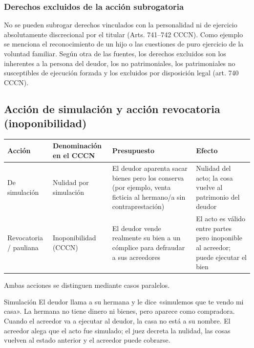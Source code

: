 \documentclass[12pt,oneside]{book}
\newenvironment{tabla}{%
    \par\medskip\begingroup\small\renewcommand{\arraystretch}{1.3}\noindent\ignorespaces
}{%
    \par\endgroup\medskip
}
\begin{document}
\subsubsection{Derechos excluidos de la acción subrogatoria}

No se pueden subrogar derechos vinculados con la personalidad ni de ejercicio absolutamente discrecional por el titular (Arts. 741--742 CCCN). Como ejemplo se menciona el reconocimiento de un hijo o las cuestiones de puro ejercicio de la voluntad familiar. Según otra de las fuentes, los derechos excluidos son los inherentes a la persona del deudor, los no patrimoniales, los patrimoniales no susceptibles de ejecución forzada y los excluidos por disposición legal (art. 740 CCCN).


\subsection{Acción de simulación y acción revocatoria (inoponibilidad)}

\begin{tabla}
\begin{tabularx}{\textwidth}{B{2.6cm}P{3.2cm}YY}
\toprule
Acción & \textbf{Denominación en el CCCN} & \textbf{Presupuesto} & \textbf{Efecto} \\
\midrule
De simulación & Nulidad por simulación & El deudor aparenta sacar bienes pero los conserva (por ejemplo, venta ficticia al hermano/a sin contraprestación) & Nulidad del acto; la cosa vuelve al patrimonio del deudor \\
Revocatoria / pauliana & Inoponibilidad (CCCN) & El deudor vende realmente su bien a un cómplice para defraudar a sus acreedores & El acto es válido entre partes pero inoponible al acreedor; puede ejecutar el bien \\
\bottomrule
\end{tabularx}
\end{tabla}

Ambas acciones se distinguen mediante casos paralelos.

\begin{example}{Simulación}
El deudor llama a su hermana y le dice «simulemos que te vendo mi casa». La hermana no tiene dinero ni bienes, pero aparece como compradora. Cuando el acreedor va a ejecutar al deudor, la casa no está a su nombre. El acreedor alega que el acto fue simulado; el juez decreta la nulidad, las cosas vuelven al estado anterior y el acreedor puede cobrarse.
\end{example}
\end{document}

